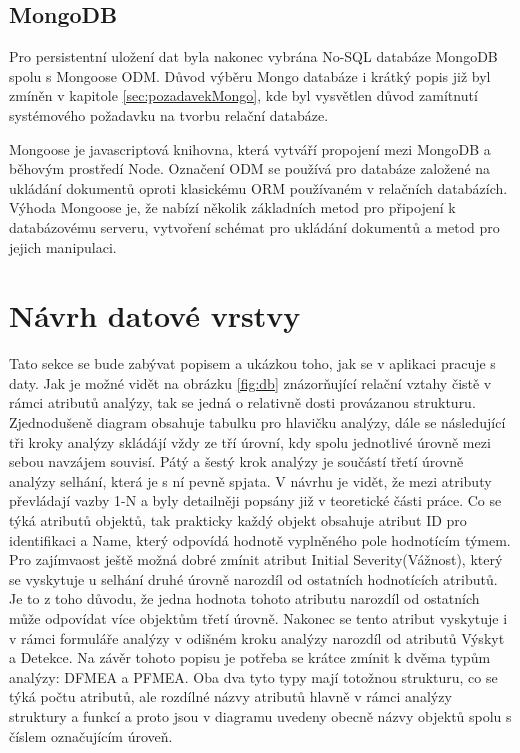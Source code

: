 \subsection{MongoDB}
\cite{mongo}Pro persistentní uložení dat byla nakonec vybrána No-SQL databáze MongoDB spolu s Mongoose ODM. Důvod výběru Mongo databáze i krátký popis již byl zmíněn v kapitole \ref{sec:pozadavekMongo}, kde byl vysvětlen důvod zamítnutí systémového požadavku na tvorbu relační databáze. 

Mongoose je javascriptová knihovna, která vytváří propojení mezi MongoDB a běhovým prostředí Node. Označení ODM se používá pro databáze založené na ukládání dokumentů oproti klasickému ORM používaném v relačních databázích. Výhoda Mongoose je, že nabízí několik základních metod pro připojení k databázovému serveru, vytvoření schémat pro ukládání dokumentů a metod pro jejich manipulaci. 

\section{Návrh datové vrstvy}
Tato sekce se bude zabývat popisem a ukázkou toho, jak se v aplikaci pracuje s daty. Jak je možné vidět na obrázku \ref{fig:db} znázorňující relační vztahy čistě v rámci atributů analýzy, tak se jedná o relativně dosti provázanou strukturu. Zjednodušeně diagram obsahuje tabulku pro hlavičku analýzy, dále se následující tři kroky analýzy skládájí vždy ze tří úrovní, kdy spolu jednotlivé úrovně mezi sebou navzájem souvisí. Pátý a šestý krok analýzy je součástí třetí úrovně analýzy selhání, která je s ní pevně spjata. V návrhu je vidět, že mezi atributy převládají vazby 1-N a byly detailněji popsány již v teoretické části práce. Co se týká atributů objektů, tak prakticky každý objekt obsahuje atribut ID pro identifikaci a Name, který odpovídá hodnotě vyplněného pole hodnotícím týmem. Pro zajímvaost ještě možná dobré zmínit atribut Initial Severity(Vážnost), který se vyskytuje u selhání druhé úrovně narozdíl od ostatních hodnotících atributů. Je to z toho důvodu, že jedna hodnota tohoto atributu narozdíl od ostatních může odpovídat více objektům třetí úrovně. Nakonec se tento atribut vyskytuje i v rámci formuláře analýzy v odišném kroku analýzy narozdíl od atributů Výskyt a Detekce. Na závěr tohoto popisu je potřeba se krátce zmínit k dvěma typům analýzy: DFMEA a PFMEA. Oba dva tyto typy mají totožnou strukturu, co se týká počtu atributů, ale rozdílné názvy atributů hlavně v rámci analýzy struktury a funkcí a proto jsou v diagramu uvedeny obecně názvy objektů spolu s číslem označujícím úroveň. 

